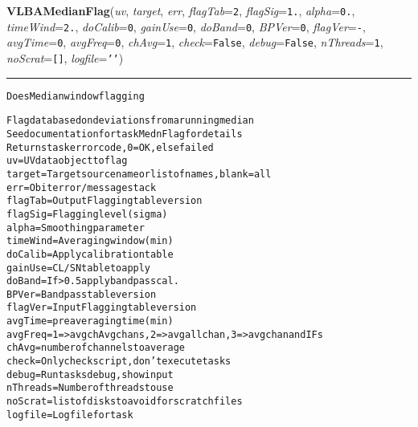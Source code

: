     \label{VLBACal:VLBAMedianFlag}
    \vspace{0.5ex}

    \begin{boxedminipage}{\textwidth}

    \raggedright \textbf{VLBAMedianFlag}(\textit{uv}, \textit{target}, \textit{err}, \textit{flagTab}=\texttt{2\-}, \textit{flagSig}=\texttt{1\-.\-}, \textit{alpha}=\texttt{0\-.\-}, \textit{timeWind}=\texttt{2\-.\-}, \textit{doCalib}=\texttt{0\-}, \textit{gainUse}=\texttt{0\-}, \textit{doBand}=\texttt{0\-}, \textit{BPVer}=\texttt{0\-}, \textit{flagVer}=\texttt{-\-}, \textit{avgTime}=\texttt{0\-}, \textit{avgFreq}=\texttt{0\-}, \textit{chAvg}=\texttt{1\-}, \textit{check}=\texttt{F\-a\-l\-s\-e\-}, \textit{debug}=\texttt{F\-a\-l\-s\-e\-}, \textit{nThreads}=\texttt{1\-}, \textit{noScrat}=\texttt{[\-]\-}, \textit{logfile}=\texttt{'\-'\-})

    \vspace{-1.5ex}

    \rule{\textwidth}{0.5\fboxrule}
\begin{alltt}
Does Median window flagging

Flag data based on deviations from a running median
See documentation for task MednFlag for details
Returns task error code, 0=OK, else failed
uv       = UV data object to flag
target   = Target source name or list of names, blank = all
err      = Obit error/message stack
flagTab  = Output Flagging table version
flagSig  = Flagging level (sigma)
alpha    = Smoothing parameter
timeWind = Averaging window (min)
doCalib  = Apply calibration table
gainUse  = CL/SN table to apply
doBand   = If {\textgreater}0.5 apply bandpass cal.
BPVer    = Bandpass table version
flagVer  = Input Flagging table version
avgTime  = preaveraging time (min)
avgFreq  = 1={\textgreater}avg chAvg chans, 2={\textgreater}avg all chan, 3={\textgreater} avg chan and IFs
chAvg    = number of channels to average
check    = Only check script, don't execute tasks
debug    = Run tasks debug, show input
nThreads = Number of threads to use
noScrat  = list of disks to avoid for scratch files
logfile  = Log file for task\end{alltt}

    \vspace{1ex}

    \end{boxedminipage}

    \label{VLBACal:VLBAOpacCor}
    \vspace{0.5ex}

